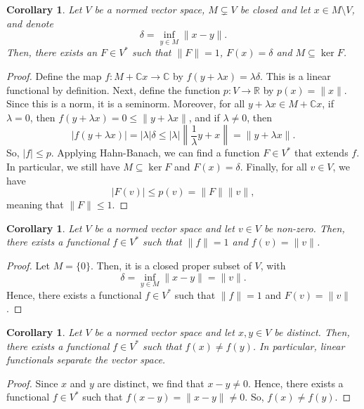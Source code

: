 \documentclass[a4paper, openany]{memoir}
\theoremstyle{definition}
\theoremstyle{plain}
\newtheorem{corollary}[definition]{Corollary}
\begin{document}
    \begin{corollary}
        Let $V$ be a normed vector space, $M \subsetneq V$ be closed and let $x \in M \setminus V$, and denote 
        \[\delta = \inf_{y \in M} \lVert x - y \rVert.\]
        Then, there exists an $F \in V^*$ such that $\lVert F \rVert = 1$, $F(x) = \delta$ and $M \subseteq \ker F$.
    \end{corollary}
    \begin{proof}
        Define the map $f \colon M + \mathbb{C}x \to \mathbb{C}$ by $f(y + \lambda x) = \lambda \delta$. This is a linear functional by definition. Next, define the function $p \colon V \to \mathbb{R}$ by $p(x) = \lVert x \rVert$. Since this is a norm, it is a seminorm. Moreover, for all $y + \lambda x \in M + \mathbb{C}x$, if $\lambda = 0$, then $f(y + \lambda x) = 0 \leq \lVert y + \lambda x \rVert$, and if $\lambda \neq 0$, then
        \[|f(y + \lambda x)| = |\lambda| \delta \leq |\lambda| \left\lVert \frac{1}{\lambda} y + x \right\rVert = \lVert y + \lambda x \rVert.\]
        So, $|f| \leq p$. Applying Hahn-Banach, we can find a function $F \in V^*$ that extends $f$. In particular, we still have $M \subseteq \ker F$ and $F(x) = \delta$. Finally, for all $v \in V$, we have 
        \[|F(v)| \leq p(v) = \lVert F \rVert \lVert v \rVert,\]
        meaning that $\lVert F \rVert \leq 1$.
    \end{proof}

    \begin{corollary}
        Let $V$ be a normed vector space and let $v \in V$ be non-zero. Then, there exists a functional $f \in V^*$ such that $\lVert f \rVert = 1$ and $f(v) = \lVert v \rVert$.
    \end{corollary}
    \begin{proof}
        Let $M = \{0\}$. Then, it is a closed proper subset of $V$, with 
        \[\delta = \inf_{y \in M} \lVert x - y \rVert = \lVert v \rVert.\]
        Hence, there exists a functional $f \in V^*$ such that $\lVert f \rVert = 1$ and $F(v) = \lVert v \rVert$.
    \end{proof}

    \begin{corollary}
        Let $V$ be a normed vector space and let $x, y \in V$ be distinct. Then, there exists a functional $f \in V^*$ such that $f(x) \neq f(y)$. In particular, linear functionals separate the vector space.
    \end{corollary}
    \begin{proof}
        Since $x$ and $y$ are distinct, we find that $x - y \neq 0$. Hence, there exists a functional $f \in V^*$ such that $f(x - y) = \lVert x - y \rVert \neq 0$. So, $f(x) \neq f(y)$.
    \end{proof}
\end{document}

